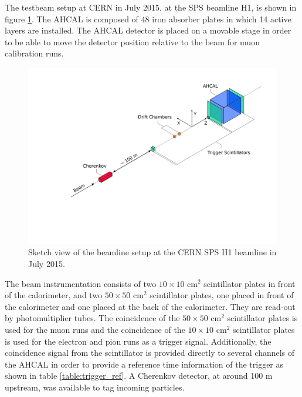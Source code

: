 The testbeam setup at CERN in July 2015, at the SPS beamline H1, is shown in figure \ref{fig:TestbeamScketch}. The AHCAL is composed of 48 iron absorber plates in which 14 active layers are installed. The AHCAL detector is placed on a movable stage in order to be able to move the detector position relative to the beam for muon calibration runs.

\begin{figure}[htbp!]
	\centering
	\includegraphics[width=0.7\linewidth]{fig/TestbeamSetup.pdf}
	\caption{Sketch view of the beamline setup at the CERN SPS H1 beamline in July 2015.} \label{fig:TestbeamScketch}
\end{figure}

The beam instrumentation consists of two $10\times10$ cm$^2$ scintillator plates in front of the calorimeter, and two $50\times50$ cm$^2$ scintillator plates, one placed in front of the calorimeter and one placed at the back of the calorimeter. They are read-out by photomultiplier tubes. The coincidence of the $50\times50$ cm$^2$ scintillator plates is used for the muon runs and the coincidence of the $10\times10$ cm$^2$ scintillator plates is used for the electron and pion runs as a trigger signal. Additionally, the coincidence signal from the scintillator is provided directly to several channels of the AHCAL in order to provide a reference time information of the trigger as shown in table \ref{table:trigger_ref}. A Cherenkov detector, at around 100 m upstream, was available to tag incoming particles.

